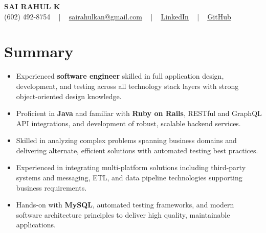 \documentclass[letterpaper,11pt]{article}
\newcommand{\resumeItem}[1]{
  \item\footnotesize{
    {#1 \vspace{-2pt}}
  }
}
\newcommand{\resumeItemListStart}{\begin{itemize}[leftmargin=*]}
\newcommand{\resumeItemListEnd}{\end{itemize}\vspace{-5pt}}
\begin{document}
\begin{center}
    {\fontsize{14pt}{12pt}\selectfont \textbf{\MakeUppercase{Sai Rahul K}}}\\ \vspace{2pt}
    \fontsize{10pt}{12pt}\selectfont (602) 492-8754 ~ | ~ \href{mailto:sairahulkan@gmail.com}{sairahulkan@gmail.com} ~ | ~
    \href{https://www.linkedin.com/in/rq123/}{\color{blue}\underline{LinkedIn}} ~ | ~
    \href{https://github.com/kanrahuldo}{\color{blue}\underline{GitHub}}~
    \vspace{-8pt}
\end{center}

\section{Summary}
\fontsize{9pt}{10pt}\selectfont
\resumeItemListStart
    \resumeItem{Experienced \textbf{software engineer} skilled in full application design, development, and testing across all technology stack layers with strong object-oriented design knowledge.}
    \resumeItem{Proficient in \textbf{Java} and familiar with \textbf{Ruby on Rails}, RESTful and GraphQL API integrations, and development of robust, scalable backend services.}
    \resumeItem{Skilled in analyzing complex problems spanning business domains and delivering alternate, efficient solutions with automated testing best practices.}
    \resumeItem{Experienced in integrating multi-platform solutions including third-party systems and messaging, ETL, and data pipeline technologies supporting business requirements.}
    \resumeItem{Hands-on with \textbf{MySQL}, automated testing frameworks, and modern software architecture principles to deliver high quality, maintainable applications.}
\resumeItemListEnd
\vspace{-6pt}
\end{document}
